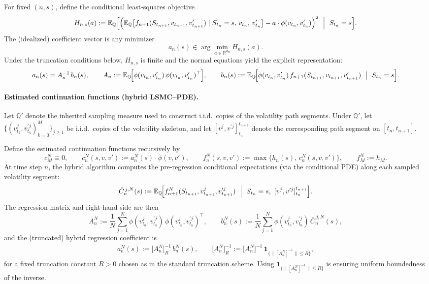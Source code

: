 \documentclass[10pt]{article}
\theoremstyle{plain}
\theoremstyle{definition}
\theoremstyle{remark}
\begin{document}
For fixed $(n,s)$, define the conditional least-squares objective
\begin{align}
H_{n,s}(a)
:=
\mathbb{E}_{\mathbb{Q}}
\Bigl[
\Bigl(
\mathbb{E}_{\mathbb{Q}}\bigl[f_{n+1}(S_{t_{n+1}},v_{t_{n+1}},v'_{t_{n+1}})
\mid S_{t_n}=s,\,v_{t_n},\,v'_{t_n}\bigr]
- a\cdot \phi(v_{t_n},v'_{t_n})
\Bigr)^2
\ \Bigm|\ S_{t_n}=s
\Bigr].
\label{eq:Hns}
\end{align}
The (idealized) coefficient vector is any minimizer
\[
a_n(s)\in \arg\min_{a\in\mathbb{R}^{d_B}} H_{n,s}(a).
\]
Under the truncation conditions below, $H_{n,s}$ is finite and the normal equations yield the explicit
representation:
\begin{align}
a_n(s) = A_n^{-1}\, b_n(s),
\qquad
A_n := \mathbb{E}_{\mathbb{Q}}\!\Bigl[\phi(v_{t_n},v'_{t_n})\,\phi(v_{t_n},v'_{t_n})^\top\Bigr],
\qquad
b_n(s) := \mathbb{E}_{\mathbb{Q}}\!\Bigl[\phi(v_{t_n},v'_{t_n})\, f_{n+1}(S_{t_{n+1}},v_{t_{n+1}},v'_{t_{n+1}})
\ \bigm|\ S_{t_n}=s\Bigr].
\label{eq:ideal_coeff_normal_eq}
\end{align}

\paragraph{Estimated continuation functions (hybrid LSMC--PDE).}
Let $\mathbb{Q}'$ denote the inherited sampling measure used to construct i.i.d.\ copies of the
volatility path segments. Under $\mathbb{Q}'$, let
$\{(v^j_{t_k},v^{\prime j}_{t_k})_{k=0}^M\}_{j\ge 1}$ be i.i.d.\ copies of the volatility skeleton, and let
$[v^j,v^{\prime j}]_{t_n}^{t_{n+1}}$ denote the corresponding path segment on $[t_n,t_{n+1}]$.

Define the estimated continuation functions recursively by
\[
c_M^N \equiv 0,\qquad
c_n^N(s,v,v') := a_n^N(s)\cdot \phi(v,v'),\qquad
f_n^N(s,v,v') := \max\{h_n(s),\,c_n^N(s,v,v')\},\qquad f_M^N := h_M.
\]
At time step $n$, the hybrid algorithm computes the pre-regression conditional expectations (via the
conditional PDE) along each sampled volatility segment:
\[
\bar C_{n}^{\,j,N}(s)
:=
\mathbb{E}_{\mathbb{Q}}\!\Bigl[
f_{n+1}^N(S_{t_{n+1}}, v^j_{t_{n+1}}, v^{\prime j}_{t_{n+1}})
\ \Bigm|\ S_{t_n}=s,\ [v^j,v^{\prime j}]_{t_n}^{t_{n+1}}
\Bigr].
\]
The regression matrix and right-hand side are then
\[
A_n^N := \frac1N\sum_{j=1}^N \phi(v^j_{t_n},v^{\prime j}_{t_n})\,\phi(v^j_{t_n},v^{\prime j}_{t_n})^\top,
\qquad
b_n^N(s) := \frac1N\sum_{j=1}^N \phi(v^j_{t_n},v^{\prime j}_{t_n})\, \bar C_{n}^{\,j,N}(s),
\]
and the (truncated) hybrid regression coefficient is
\begin{align}
a_n^N(s) := \bigl[A_n^N\bigr]^{-1}_R\, b_n^N(s),
\qquad
\bigl[A_n^N\bigr]^{-1}_R := \bigl[A_n^N\bigr]^{-1}\,
\mathbf{1}_{\{\|[A_n^N]^{-1}\|\le R\}},
\label{eq:estimated_coeff}
\end{align}
for a fixed truncation constant $R>0$ chosen as in the standard truncation scheme.  Using $\mathbf{1}_{\{\|[A_n^N]^{-1}\|\le R\}}$ is ensuring uniform boundedness of
the inverse.
\medskip
\end{document}
